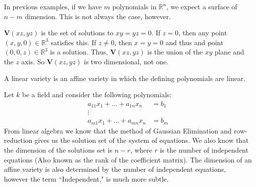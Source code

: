                 In previous examples, if we have $m$ polynomials
                in $\mathbb{R}^n$, we expect a surface of $n-m$
                dimension. This is not always the case, however.
                \begin{example}
                    $\mathbf{V}(xz,yz)$ is the set of solutions
                    to $xy=yz=0$. If $z=0$, then any point
                    $(x,y,0)\in \mathbb{R}^3$ satisfies this.
                    If $z\ne 0$, then $x=y=0$ and thus and point
                    $(0,0,z)\in \mathbb{R}^3$ is a solution.
                    Thus, $\mathbf{V}(xz,yz)$ is the union of the $xy$
                    plane and the $z$ axis. So $\mathbf{V}(xz,yz)$
                    is two dimensional, not one.
                \end{example}
                \begin{definition}
                    A linear variety is an affine variety
                    in which the defining polynomials are linear.
                \end{definition}
                \begin{example}
                    Let $k$ be a field and consider
                    the following polynomials:
                    \begin{align*}
                        a_{11}x_{1}+\hdots+a_{1n}x_{n}
                        &=b_{1}\\
                        \vdots&\\
                        a_{m1}x_{1}+\hdots+a_{mn}x_{n}
                        &=b_{m}
                    \end{align*}
                    From linear algebra we know that the
                    method of Gaussian Elimination and
                    row-reduction gives us the solution set of the
                    system of equations. We also know that the
                    dimension of the solutions set is $n-r$, where $r$
                    is the number of independent equations
                    (Also known as the rank of the coefficient matrix).
                    The dimension of an affine variety is also
                    determined by the number of independent equations,
                    however the term ``Independent," is much more subtle.
                \end{example}
